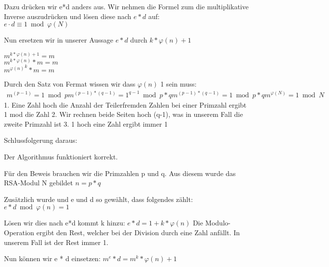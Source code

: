 Dazu drücken wir e*d anders aus. Wir nehmen die Formel zum die multiplikative Inverse auszudrücken und lösen diese nach $ e*d $ auf:\\
$ e \cdot d \equiv 1 \bmod{\varphi(N)} $

Nun ersetzen wir in unserer Aussage $ e*d $ durch $ k* \varphi(n)+1 $
\begin{center}
$ m^{ k* \varphi(n) +1} = m $ \\
$ m^{k* \varphi(n)} * m = m $ \\
$ { m^{ \varphi(n) }} ^k * m = m $ \\
\end{center}

Durch den Satz von Fermat wissen wir dass $ \varphi(n) $ 1 sein muss:
\begin{align}
  m^{(p-1)} = 1 \bmod p
  m^{(p-1)*(q-1)} = 1^{q-1} \bmod p*q
  m^{(p-1)*(q-1)} = 1 \bmod p*q
  m^{\varphi(N)} = 1 \bmod N
\end{align}
1. Eine Zahl hoch die Anzahl der Teilerfremden Zahlen bei einer Primzahl ergibt 1 mod die Zahl
2. Wir rechnen beide Seiten hoch (q-1), was in unserem Fall die zweite Primzahl ist %
3. 1 hoch eine Zahl ergibt immer 1

Schlussfolgerung daraus:
 
 Der Algorithmus funktioniert korrekt. 


Für den Beweis brauchen wir die Primzahlen p und q. Aus diesem wurde das RSA-Modul N gebildet
$ n = p * q $

Zusätzlich wurde und e und d so gewählt, dass folgendes zählt:
$ e * d \bmod \varphi(n) = 1 $

Lösen wir dies nach e*d kommt k hinzu:
$ e * d = 1 + k * \varphi(n) $
Die Modulo-Operation ergibt den Rest, welcher bei der Division durch eine Zahl anfällt. In unserem Fall ist der Rest immer 1.

Nun können wir e * d einsetzen:
$ m^e*d = m^k*\varphi(n)+1 $

